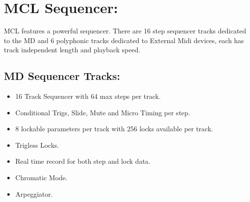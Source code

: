 \chapter{MCL Sequencer:}
MCL features a powerful sequencer. There are 16 step sequencer tracks dedicated to the MD and 6 polyphonic tracks dedicated to External Midi devices, each has track independent length and playback speed.
\section{MD Sequencer Tracks:}
\begin{itemize}
\item 16 Track Sequencer with 64 max steps per track.
\item Conditional Trigs, Slide, Mute and Micro Timing per step.
\item 8 lockable parameters per track with 256 locks available per track.
\item Trigless Locks.
\item Real time record for both step and lock data.
\item Chromatic Mode.
\item Arpeggiator.
\end{itemize}
